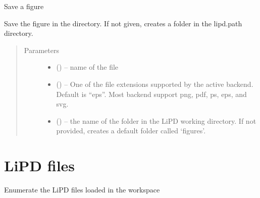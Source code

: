 \documentclass[letterpaper,10pt,english]{sphinxmanual}
\begin{document}
\begin{fulllineitems}
\label{\detokenize{LipdUtils:pyleoclim.LipdUtils.saveFigure}}
Save a figure

Save the figure in the directory. If not given, creates a folder in the
lipd.path directory.
\begin{quote}\begin{description}
\item[{Parameters}] \leavevmode\begin{itemize}
\item {} 
 () -- name of the file

\item {} 
 () -- One of the file extensions supported by the active
backend. Default is ``eps''. Most backend support png, pdf, ps, eps,
and svg.

\item {} 
 () -- the name of the folder in the LiPD working directory.
If not provided, creates a default folder called `figures'.

\end{itemize}

\end{description}\end{quote}

\end{fulllineitems}



\section{LiPD files}
\label{\detokenize{LipdUtils:lipd-files}}

\begin{fulllineitems}
\label{\detokenize{LipdUtils:pyleoclim.LipdUtils.enumerateLipds}}
Enumerate the LiPD files loaded in the workspace

\end{fulllineitems}

\end{document}

